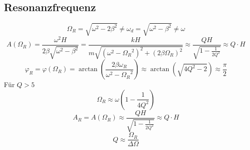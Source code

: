 \subsection{Resonanzfrequenz}
\[ \boxed{\Omega_R = \sqrt{\omega^2 - 2\beta^2} \neq \omega_d 
= \sqrt{\omega^2 - \beta^2} \neq \omega} \]
\[ \boxed{A(\Omega_R) = \frac{\omega^2 H}{2 \beta \sqrt{\omega^2 - \beta^2}} 
= \frac{k H}{m \sqrt{(\omega^2 - {\Omega_R}^2)^2 + (2\beta\Omega_R)^2}} 
\approx \frac{Q H}{\sqrt{1 - \frac{1}{2 Q^2}}} \approx Q \cdot H} \]
\[ \boxed{\varphi_R = \varphi(\Omega_R) 
= \arctan\left(\frac{2 \beta \omega_R}{\omega^2 - {\Omega_R}^2}\right) 
\approx \arctan\left(\sqrt{4 Q^2 - 2}\right) \approx \frac{\pi}{2}} \]
Für $Q>5$
\[ \boxed{\Omega_R \approx \omega \left(1 - \frac{1}{4Q^2}\right)} \]
\[ \boxed{A_R = A(\Omega_R) \approx \frac{Q H}{\sqrt{1 - \frac{1}{2Q^2}}} 
\approx Q \cdot H} \]
\[ \boxed{Q \approx \frac{\Omega_R}{\Delta\Omega}} \]
